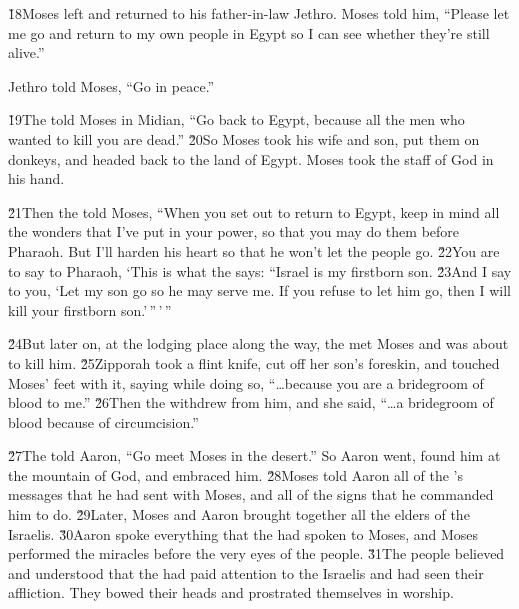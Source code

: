 \v{18}Moses left and returned to his father-in-law Jethro. Moses told him, ``Please let me go and return to my own people in Egypt so I can see whether they're still alive.''

Jethro told Moses, ``Go in peace.''

\v{19}The  told Moses in Midian, ``Go back to Egypt, because all the men who wanted to kill you are dead.'' \v{20}So Moses took his wife and son, put them on donkeys, and headed back to the land of Egypt. Moses took the staff of God in his hand.

\v{21}Then the  told Moses, ``When you set out to return to Egypt, keep in mind all the wonders that I've put in your power, so that you may do them before Pharaoh. But I'll harden his heart so that he won't let the people go. \v{22}You are to say to Pharaoh, `This is what the  says: ``Israel is my firstborn son. \v{23}And I say to you, `Let my son go so he may serve me. If you refuse to let him go, then I will kill your firstborn son.'\,''\,'\,''

\v{24}But later on, at the lodging place along the way, the  met Moses and was about to kill him. \v{25}Zipporah took a flint knife, cut off her son's foreskin, and touched Moses' feet with it, saying while doing so, ``{\ldots}because you are a bridegroom of blood to me.'' \v{26}Then the  withdrew from him, and she said, ``{\ldots}a bridegroom of blood because of circumcision.''

\v{27}The  told Aaron, ``Go meet Moses in the desert.'' So Aaron went, found him at the mountain of God, and embraced him. \v{28}Moses told Aaron all of the 's messages that he had sent with Moses, and all of the signs that he commanded him to do. \v{29}Later, Moses and Aaron brought together all the elders of the Israelis. \v{30}Aaron spoke everything that the  had spoken to Moses, and Moses performed the miracles before the very eyes of the people. \v{31}The people believed and understood that the  had paid attention to the Israelis and had seen their affliction. They bowed their heads and prostrated themselves in worship.


